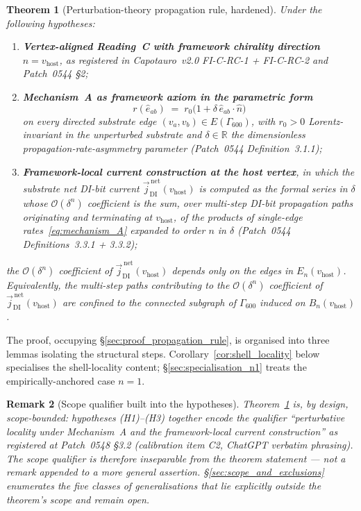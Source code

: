\documentclass[11pt,letterpaper]{article}
\newtheorem{theorem}{Theorem}[section]
\newtheorem{remark}[theorem]{Remark}
\newcommand{\nhat}{\hat{n}}
\newcommand{\vhost}{v_{\text{host}}}
\newcommand{\jDInet}{\vec{j}_{\text{DI}}^{\,\text{net}}}
\newcommand{\Eorder}[1]{\mathcal{O}(\delta^{#1})}
\newcommand{\Gsixcell}{\Gamma_{600}}
\begin{document}
\begin{theorem}[Perturbation-theory propagation rule, hardened]\label{thm:propagation_rule}
Under the following hypotheses:
\begin{enumerate}[label=(H\arabic*)]
\item \textbf{Vertex-aligned Reading~C with framework chirality direction $\nhat = \vhost$}, as registered in Capotauro~v2.0 FI-C-RC-1 + FI-C-RC-2 and Patch~0544 \S2;
\item \textbf{Mechanism~A as framework axiom in the parametric form}
\begin{equation}\label{eq:mechanism_A}
r(\hat{e}_{ab}) \;=\; r_0\bigl(1 + \delta\,\hat{e}_{ab}\cdot\nhat\bigr)
\end{equation}
on every directed substrate edge $(v_a, v_b) \in E(\Gsixcell)$, with $r_0 > 0$ Lorentz-invariant in the unperturbed substrate and $\delta \in \mathbb{R}$ the dimensionless propagation-rate-asymmetry parameter (Patch~0544 Definition~3.1.1);
\item \textbf{Framework-local current construction at the host vertex}, in which the substrate net DI-bit current $\jDInet(\vhost)$ is computed as the formal series in $\delta$ whose $\Eorder{n}$ coefficient is the sum, over multi-step DI-bit propagation paths originating and terminating at $\vhost$, of the products of single-edge rates~\eqref{eq:mechanism_A} expanded to order $n$ in $\delta$ (Patch~0544 Definitions~3.3.1 + 3.3.2);
\end{enumerate}
the $\Eorder{n}$ coefficient of $\jDInet(\vhost)$ depends only on the edges in $E_n(\vhost)$. Equivalently, the multi-step paths contributing to the $\Eorder{n}$ coefficient of $\jDInet(\vhost)$ are confined to the connected subgraph of $\Gsixcell$ induced on $B_n(\vhost)$.
\end{theorem}

The proof, occupying \S\ref{sec:proof_propagation_rule}, is organised into three lemmas isolating the structural steps. Corollary~\ref{cor:shell_locality} below specialises the shell-locality content; \S\ref{sec:specialisation_n1} treats the empirically-anchored case $n = 1$.

\begin{remark}[Scope qualifier built into the hypotheses]\label{rem:scope_qualifier}
Theorem~\ref{thm:propagation_rule} is, by design, scope-bounded: hypotheses (H1)--(H3) together encode the qualifier ``perturbative locality under Mechanism~A and the framework-local current construction'' as registered at Patch~0548 \S3.2 (calibration item C2, ChatGPT verbatim phrasing). The scope qualifier is therefore inseparable from the theorem statement --- not a remark appended to a more general assertion. \S\ref{sec:scope_and_exclusions} enumerates the five classes of generalisations that lie explicitly outside the theorem's scope and remain open.
\end{remark}
\end{document}
